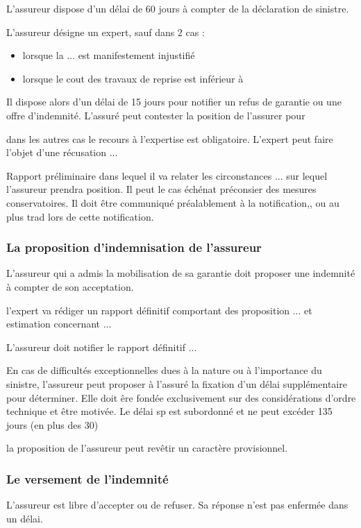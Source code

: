 			L'assureur dispose d'un délai de 60 jours à compter de la déclaration de sinistre.

			L'assureur désigne un expert, sauf dans 2 cas :
			\begin{itemize}
				\item lorsque la ... est manifestement injustifié
				\item lorsque le cout des travaux de reprise est inférieur à 
			\end{itemize}
			Il dispose alors d'un délai de 15 jours pour notifier un refus de garantie ou une offre d'indemnité.
			L'assuré peut contester la position de l'assurer pour

			dans les autres cas le recours à l'expertise est obligatoire. L'expert peut faire l'objet d'une récusation ...

			Rapport préliminaire dans lequel il va relater les circonstances ... sur lequel l'assureur prendra position. Il peut le cas échénat préconsier des mesures conservatoires. Il doit être communiqué préalablement à la notification,, ou au plus trad lors de cette notification.

		\subsubsection{La proposition d'indemnisation de l'assureur}

			L'assureur qui a admis la mobilisation de sa garantie doit proposer une indemnité à compter de son acceptation.

			l'expert va rédiger un rapport définitif comportant des proposition ... et estimation concernant ...

			L'assureur doit notifier le rapport définitif ...

			En cas de difficultés exceptionnelles dues à la nature ou à l'importance du sinistre, l'assureur peut proposer à l'assuré la fixation d'un délai supplémentaire pour déterminer. Elle doit êre fondée exclusivement sur des considérations d'ordre technique et être motivée. Le délai sp est subordonné et ne peut excéder 135 jours (en plus des 30)

			la proposition de l'assureur peut revêtir un caractère provisionnel.

		\subsubsection{Le versement de l'indemnité}

			L'assureur est libre d'accepter ou de refuser. Sa réponse n'est pas enfermée dans un délai.

